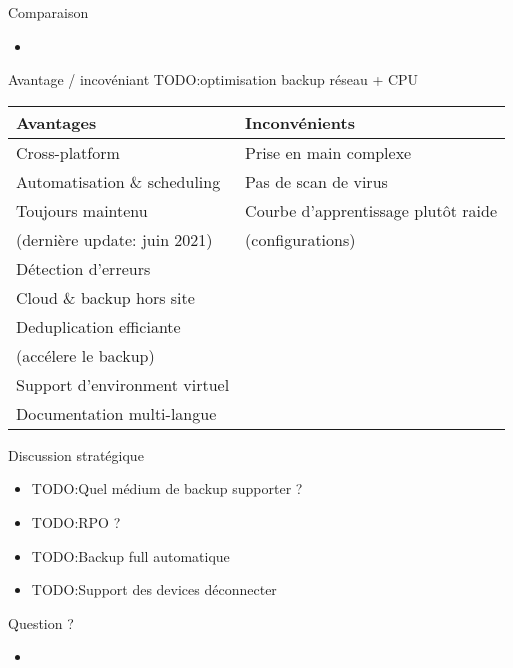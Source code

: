 \documentclass[aspectratio=169]{beamer}
\newcommand{\TODO}{TODO:}
\begin{document}
\begin{frame}{Comparaison}
 \begin{itemize}
  \item 
 \end{itemize}
\end{frame}

\begin{frame}{Avantage / incovéniant}
 \TODO optimisation backup réseau + CPU
    \begin{center}
     \begin{tabular}{|l|l|}
     \hline
      \textbf{Avantages} & \textbf{Inconvénients} \\
     \hline
     \hline
        Cross-platform & Prise en main complexe \\
     \hline
      Automatisation \& scheduling & Pas de scan de virus\\
     \hline
     Toujours maintenu  & Courbe d'apprentissage plutôt raide \\
     (dernière update: juin 2021) & (configurations) \\
     \hline
     Détection d'erreurs & \\
     \hline
     Cloud \& backup hors site & \\
     \hline
     Deduplication efficiante & \\
     (accélere le backup) & \\
     \hline
     Support d'environment virtuel & \\
     \hline
     Documentation multi-langue & \\
     \hline
     \end{tabular}

    \end{center}

\end{frame}

\begin{frame}{Discussion stratégique}
 \begin{itemize}
  \item \TODO Quel médium de backup supporter ?
  \item \TODO RPO ?
  \item \TODO Backup full automatique
  \item \TODO Support des devices déconnecter
 \end{itemize}
\end{frame}

\begin{frame}{Question ?}
 \begin{itemize}
  \item 
 \end{itemize}
\end{frame}
\end{document}
